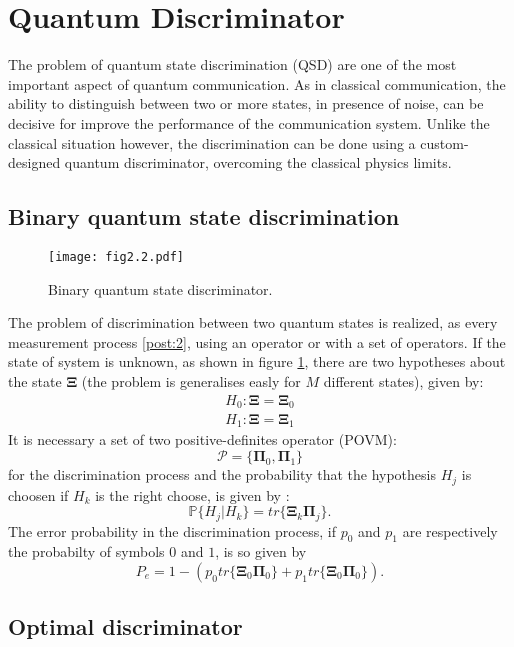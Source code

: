 \section{Quantum Discriminator}
    The problem of quantum state discrimination (QSD) are one of the most important
    aspect of quantum communication. As in classical communication, the ability to 
    distinguish between two or more states, in presence of noise, can be decisive for improve
    the performance of the communication system. Unlike the classical situation however,
    the discrimination can be done using a custom-designed quantum discriminator, overcoming
    the classical physics limits.

    \subsection{Binary quantum state discrimination}
    \begin{figure}[ht]
        \begin{center}
            \texttt{[image: fig2.2.pdf]}
            \caption{Binary quantum state discriminator.}
            \label{fig:2.2}
        \end{center}
    \end{figure}
    The problem of discrimination between two quantum states is realized, as every measurement
    process \ref{post:2}, using an operator or with a set of operators.
    If the state of system is unknown, as shown in figure \ref{fig:2.2}, there are two hypotheses
    about the state $\pmb{\Xi}$ (the problem is generalises easly for $M$ different states),
    given by:
    \begin{equation}\begin{split}
        H_0 : \pmb{\Xi}=\pmb{\Xi}_0\\
        H_1 : \pmb{\Xi}=\pmb{\Xi}_1
        \label{eq:binHyp}
    \end{split}\end{equation}
    It is necessary a set of two positive-definites operator (POVM):
    \begin{equation}
        \mathcal{P}=\{\pmb{\Pi}_0,\pmb{\Pi}_1\}
    \end{equation}
    for the discrimination process and the probability that the hypothesis $H_j$ is choosen
    if $H_k$ is the right choose, is given by \cite{tesiGuerrini}:
    \begin{equation}
        \mathbb{P}\{H_j|H_k\}=tr\{\pmb{\Xi}_k\pmb{\Pi}_j\}.
    \end{equation}
    The error probability in the discrimination process, if $p_0$ and $p_1$ are respectively 
    the probabilty of symbols $0$ and $1$, is so given by
    \begin{equation}
        P_e=1-\left(p_0 tr\{\pmb{\Xi}_0\pmb{\Pi}_0\}+p_1 tr\{\pmb{\Xi}_0\pmb{\Pi}_0\}\right).
    \end{equation}

    \subsection{Optimal discriminator}
    